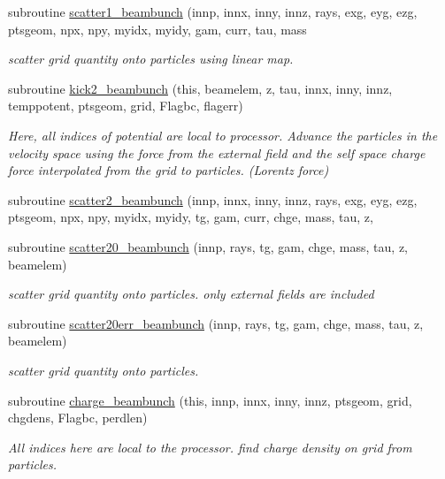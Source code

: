 \begin{DoxyCompactItemize}
subroutine \mbox{\hyperlink{namespacebeambunchclass_a023a12f9279f0764fc57deda1bcb852f}{scatter1\+\_\+beambunch}} (innp, innx, inny, innz, rays, exg, eyg, ezg, ptsgeom, npx, npy, myidx, myidy, gam, curr, tau, mass
\begin{DoxyCompactList}\small\item\em scatter grid quantity onto particles using linear map. \end{DoxyCompactList}\item 
subroutine \mbox{\hyperlink{namespacebeambunchclass_a398a8735bfae34f0d7a9337c8e5ec621}{kick2\+\_\+beambunch}} (this, beamelem, z, tau, innx, inny, innz, temppotent, ptsgeom, grid, Flagbc, flagerr)
\begin{DoxyCompactList}\small\item\em Here, all indices of potential are local to processor. Advance the particles in the velocity space using the force from the external field and the self space charge force interpolated from the grid to particles. (Lorentz force) \end{DoxyCompactList}\item 
subroutine \mbox{\hyperlink{namespacebeambunchclass_ad2054e6e5714a86db0112c5eb3978abb}{scatter2\+\_\+beambunch}} (innp, innx, inny, innz, rays, exg, eyg, ezg, ptsgeom, npx, npy, myidx, myidy, tg, gam, curr, chge, mass, tau, z,
\item 
subroutine \mbox{\hyperlink{namespacebeambunchclass_a8a96c99996275cf03ceec41dc011695e}{scatter20\+\_\+beambunch}} (innp, rays, tg, gam, chge, mass, tau, z, beamelem)
\begin{DoxyCompactList}\small\item\em scatter grid quantity onto particles. only external fields are included \end{DoxyCompactList}\item 
subroutine \mbox{\hyperlink{namespacebeambunchclass_add3fe05fd157f9a0d3f09445660f038e}{scatter20err\+\_\+beambunch}} (innp, rays, tg, gam, chge, mass, tau, z, beamelem)
\begin{DoxyCompactList}\small\item\em scatter grid quantity onto particles. \end{DoxyCompactList}\item 
subroutine \mbox{\hyperlink{namespacebeambunchclass_a91563d467d36ccca8231ee2c62483246}{charge\+\_\+beambunch}} (this, innp, innx, inny, innz, ptsgeom, grid, chgdens, Flagbc, perdlen)
\begin{DoxyCompactList}\small\item\em All indices here are local to the processor. find charge density on grid from particles. \end{DoxyCompactList}\item 

\end{DoxyCompactItemize}
